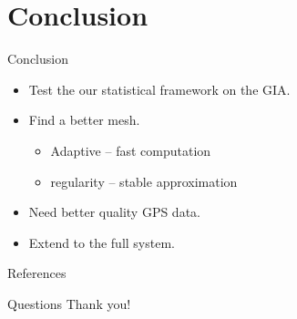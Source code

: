 \documentclass{beamer}
\begin{document}
\section{Conclusion}
\begin{frame}{Conclusion}

\begin{itemize}
\item Test the our statistical framework on the GIA.
\item Find a better mesh.
\begin{itemize}
\item Adaptive -- fast computation
\item regularity -- stable approximation
\end{itemize}
\item Need better quality GPS data.
\item Extend to the full system.
\end{itemize}


\end{frame}

\begin{frame}{References}

\small{}
\end{frame}


\begin{frame}{Questions}
\centering
\Huge
Thank you!
\end{frame}
\end{document}
